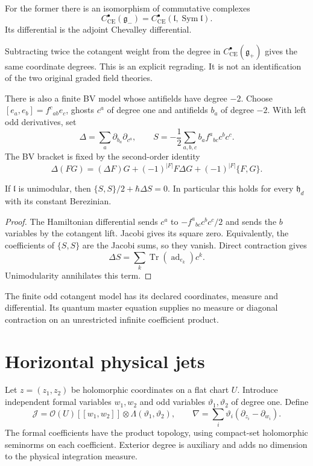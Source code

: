For the former there is an isomorphism of commutative complexes
\[
 C^\bullet_{\mathrm{CE}}(\mathfrak g_-)
   =C^\bullet_{\mathrm{CE}}
      (\mathfrak l,\operatorname{Sym}\mathfrak l).
\]
Its differential is the adjoint Chevalley differential.

Subtracting twice the cotangent weight from the degree in
$C^\bullet_{\mathrm{CE}}(\mathfrak g_+)$ gives the same coordinate
degrees. This is an explicit regrading. It is not an identification
of the two original graded field theories.

There is also a finite BV model whose antifields have degree $-2$.
Choose $[e_a,e_b]=f^c{}_{ab}e_c$, ghosts $c^a$ of degree one and
antifields $b_a$ of degree $-2$. With left odd derivatives, set
\[
 \Delta=\sum_a\partial_{b_a}\partial_{c^a},\qquad
 S=-\frac12\sum_{a,b,c}b_a f^a{}_{bc}c^bc^c.
\]
The BV bracket is fixed by the second-order identity
\[
 \Delta(FG)=(\Delta F)G+(-1)^{|F|}F\Delta G
                         +(-1)^{|F|}\{F,G\}.
\]

\begin{proposition}\label{mht:prop:finite-hamiltonian-bv}
If $\mathfrak l$ is unimodular, then
$\{S,S\}/2+\hbar\Delta S=0$. In particular this holds for every
$\mathfrak h_d$ with its constant Berezinian.
\end{proposition}

\begin{proof}
The Hamiltonian differential sends
$c^a$ to $-f^a{}_{bc}c^bc^c/2$ and sends the $b$ variables by
the cotangent lift. Jacobi gives its square zero.
Equivalently, the coefficients of $\{S,S\}$ are the Jacobi sums,
so they vanish. Direct contraction gives
\[
 \Delta S=\sum_k\operatorname{Tr}(\operatorname{ad}_{e_k})c^k.
\]
Unimodularity annihilates this term.
\end{proof}

The finite odd cotangent model has its declared coordinates,
measure and differential. Its quantum master equation supplies no
measure or diagonal contraction on an unrestricted infinite
coefficient product.

\section{Horizontal physical jets}

Let $z=(z_1,z_2)$ be holomorphic coordinates on a flat chart $U$.
Introduce independent formal variables $w_1,w_2$ and odd variables
$\vartheta_1,\vartheta_2$ of degree one. Define
\[
 \mathcal J=\mathcal O(U)[[w_1,w_2]]
               \otimes\Lambda(\vartheta_1,\vartheta_2),\qquad
 \nabla=\sum_i\vartheta_i(\partial_{z_i}-\partial_{w_i}).
\]
The formal coefficients have the product topology, using compact-set
holomorphic seminorms on each coefficient. Exterior degree is
auxiliary and adds no dimension to the physical integration measure.

